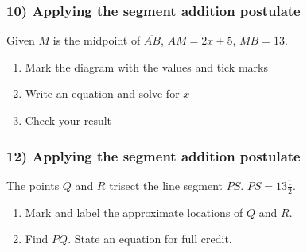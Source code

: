 \documentclass{beamer}
\begin{document}
  \frame
  {
    \frametitle{10) Applying the segment addition postulate}
    Given $M$ is the midpoint of $\overline{AB}$, $AM=2x+5$, $MB=13$.
    \begin{enumerate}
      \item Mark the diagram with the values and tick marks
      \item Write an equation and solve for $x$
      \item Check your result
    \end{enumerate} \vspace{1cm}
      \begin{center}
      \end{center} \vspace{4cm}
  }

  \frame
  {
    \frametitle{12) Applying the segment addition postulate}
      The points $Q$ and $R$ trisect the line segment $\overline{PS}$. $PS=13 \frac{1}{2}$.
      \begin{enumerate}
        \item Mark and label the approximate locations of $Q$ and $R$.
        \item Find ${PQ}$. State an equation for full credit.
      \end{enumerate} \vspace{1cm} 
      \begin{center}
      \end{center} \vspace{3cm} 
  }
\end{document}
